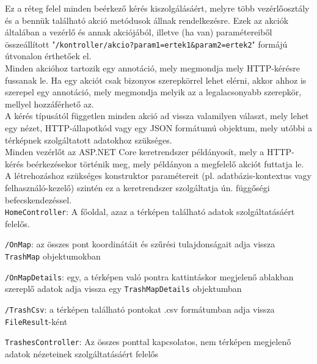 Ez a réteg felel minden beérkező kérés kiszolgálásáért, melyre több vezérlőosztály és a bennük található akció metódusok állnak rendelkezésre. Ezek az akciók általában a vezérlő és annak akciójából, illetve (ha van) paramétereiből összeállított "\texttt{/kontroller/akcio?param1=ertek1\&param2=ertek2}" formájú útvonalon érthetőek el.\\
Minden akcióhoz tartozik egy annotáció, mely megmondja mely HTTP-kérésre fussanak le. Ha egy akciót csak bizonyos szerepkörrel lehet elérni, akkor ahhoz is szerepel egy annotáció, mely megmondja melyik az a legalacsonyabb szerepkör, mellyel hozzáférhető az.\\
A kérés típusától független minden akció ad vissza valamilyen választ, mely lehet egy nézet, HTTP-állapotkód vagy egy JSON formátumú objektum, mely utóbbi a térképnek szolgáltatott adatokhoz szükséges.\\
Minden vezérlőt az ASP.NET Core keretrendszer példányosít, mely a HTTP-kérés beérkezésekor történik meg, mely példányon a megfelelő akciót futtatja le. A létrehozáshoz szükséges konstruktor paramétereit (pl. adatbázis-kontextus vagy felhasználó-kezelő) szintén ez a keretrendszer szolgáltatja ún. függőségi befecskendezéssel. \cite{dependency-injection} \\
\texttt{HomeController}: A főoldal, azaz a térképen található adatok szolgáltatásáért felelős.
\begin{compactitem}
	\item \texttt{/OnMap}: az összes pont koordinátáit és szűrési tulajdonságait adja vissza \texttt{TrashMap} objektumokban
	\item \texttt{/OnMapDetails}: egy, a térképen való pontra kattintáskor megjelenő ablakban szereplő adatok adja vissza egy \texttt{TrashMapDetails} objektumban
	\item \texttt{/TrashCsv}: a térképen található pontokat .csv formátumban adja vissza \texttt{FileResult}-ként
\end{compactitem}
\texttt{TrashesController}: Az összes ponttal kapcsolatos, nem térképen megjelenő adatok nézeteinek szolgáltatásáért felelős
